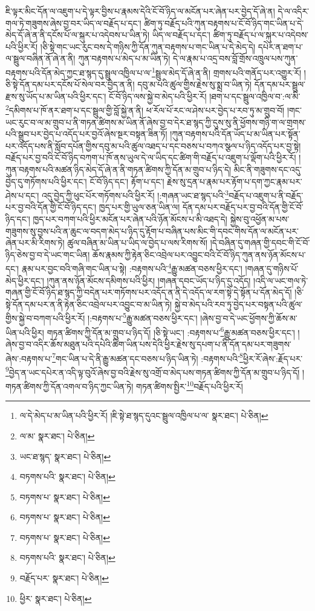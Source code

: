 ཇི་ལྟར་མིང་དོན་ལ་འཇུག་པ་དེ་ལྟར་བྱིས་པ་རྣམས་དེའི་ངོ་བོ་ཉིད་ལ་མངོན་པར་ཞེན་པར་བྱེད་དོ་ཞེ་ན། དེ་ལ་འདིར་གལ་ཏེ་གཟུགས་ཞེས་བྱ་བར་ཡིད་ལ་བརྗོད་པ་དང་། ཚིག་ཏུ་བརྗོད་པའི་ཀུན་བརྟགས་པ་ངོ་བོ་ཉིད་གང་ཡིན་པ་དེ་མེད་དོ་ཞེ་ན་ནི་དངོས་པོ་ལ་སྐུར་པ་འདེབས་པ་ཡིན་ཏེ། ཡིད་ལ་བརྗོད་པ་དང་། ཚིག་ཏུ་བརྗོད་པ་ལ་སྐུར་པ་འདེབས་པའི་ཕྱིར་རོ། །ཅི་སྟེ་གང་ཡང་རུང་བས་དེ་གཉིས་ཀྱི་དོན་ཀུན་བརྟགས་པ་གང་ཡིན་པ་དེ་མེད་དེ། དཔེར་ན་ཐག་པ་ལ་སྦྲུལ་བཞིན་ནོ་ཞེ་ན་ནི། ཀུན་བརྟགས་པ་མེད་པ་མ་ཡིན་ཏེ། དེ་ལ་རྣམ་པ་འདྲ་བས་བློ་གྲོས་འཁྲུལ་པས་ཀུན་བརྟགས་པའི་དོན་མེད་ཀྱང་ཐ་སྙད་དུ་སྦྲུལ་འཁྱིལ་པ་ལ་\footnote{ལ་དེ་མེད་པ་མ་ཡིན་པའི་ཕྱིར་རོ། །ཇི་སྟེ་ཐ་སྙད་དུའང་སྦྲུལ་འཁྱིལ་པ་ལ་  སྣར་ཐང་།  པེ་ཅིན། }སྦྲུལ་མེད་དོ་ཞེ་ན་ནི། གྲགས་པའི་གནོད་པར་འགྱུར་རོ། །ཅི་སྟེ་དོན་དམ་པར་དངོས་པོ་སེལ་བར་བྱེད་ན་ནི། དབུ་མ་པའི་ཚུལ་གྱིས་རྗེས་སུ་སྨྲ་བ་ཡིན་ཏེ། དོན་དམ་པར་སྦྲུལ་རྫས་སུ་ཡོད་པ་མ་ཡིན་པའི་ཕྱིར་དང་། ངོ་བོ་ཉིད་ལས་སྐྱེ་བ་མེད་པའི་ཕྱིར་རོ། །ཐག་པ་དང་སྦྲུལ་འཁྱིལ་བ་:ལ་མི་\footnote{ལ་མ་  སྣར་ཐང་།  པེ་ཅིན། }དམིགས་པ་ཁོ་ནར་ཐག་པ་དང་སྦྲུལ་གྱི་བློ་སྐྱེ་ན་ནི། ཕ་རོལ་པོ་རང་ལ་ཤེས་པར་བྱེད་པ་རབ་ཏུ་མ་གྲུབ་བོ། །གང་ཡང་རུང་བ་ལ་མ་གྲུབ་པ་ནི་གཏན་ཚིགས་མ་ཡིན་ནོ་ཞེས་བྱ་བ་དེར་ཐ་སྙད་ཀྱི་དུས་སུ་ནི་ཕྱོགས་གཉི་ག་ལ་གྲགས་པའི་སྒྲུབ་པར་བྱེད་པ་འདོད་པར་བྱའོ་ཞེས་སྔར་བསྟན་ཟིན་ཏོ། །ཀུན་བརྟགས་པའི་དོན་ཡོད་པ་མ་ཡིན་པར་སྟོན་པར་འདོད་པས་ནི་སློབ་དཔོན་གྱིས་དབུ་མ་པའི་ཚུལ་འཐད་པ་དང་བཅས་པ་བཀའ་སྩལ་པ་ཉིད་འདོད་པར་བྱ་སྟེ། བརྗོད་པར་བྱ་བའི་ངོ་བོ་ཉིད་བཀག་པ་ཁོ་ནས་ཡུལ་དེ་ལ་ཡིད་དང་ཚིག་གི་བརྗོད་པ་འཇུག་པ་ལྡོག་པའི་ཕྱིར་རོ། །ཀུན་བརྟགས་པའི་མཚན་ཉིད་མེད་དོ་ཞེ་ན་ནི་གཏན་ཚིགས་ཀྱི་དོན་མ་གྲུབ་པ་ཉིད་དེ། མིང་ནི་གཟུགས་དང་འདུ་བྱེད་དུ་གཏོགས་པའི་ཕྱིར་དང་། ངོ་བོ་ཉིད་དང་། རྟོག་པ་དང་། རྗེས་སུ་དྲན་པ་རྣམ་པར་རྟོག་པ་དག་ཀྱང་རྣམ་པར་ཤེས་པ་དང་། འདུ་བྱེད་ཀྱི་ཕུང་པོར་གཏོགས་པའི་ཕྱིར་རོ། །:གཞན་ཡང་ཐ་སྙད་པའི་\footnote{ཡང་ཐ་སྙད་  སྣར་ཐང་།  པེ་ཅིན། }བརྗོད་པ་འཇུག་པ་ནི་བརྗོད་པར་བྱ་བའི་དོན་གྱི་ངོ་བོ་ཉིད་དང་། ཁྱད་པར་གྱི་ཡུལ་ཅན་ཡིན་ལ། དོན་དམ་པར་བརྗོད་པར་བྱ་བའི་དོན་གྱི་ངོ་བོ་ཉིད་དང་། ཁྱད་པར་བཀག་པའི་ཕྱིར་མངོན་པར་ཞེན་པའི་ཉོན་མོངས་པ་མི་འཐད་དེ། སྐྱེས་བུ་འཕྱོན་མ་པས་གཟུགས་སུ་བྱས་པའི་ན་ཆུང་ལ་བདག་མེད་པ་ཉིད་དུ་རྟོག་པ་བཞིན་པས་མིང་གི་དབང་གིས་དོན་ལ་མངོན་པར་ཞེན་པར་མི་རིགས་ཏེ། ཚུལ་བཞིན་མ་ཡིན་པ་ཡིད་ལ་བྱེད་པ་ལས་རིགས་སོ། །དེ་བཞིན་དུ་གཞན་གྱི་དབང་གི་ངོ་བོ་ཉིད་ཅེས་བྱ་བ་དེ་ཡང་གང་ཡིན། ཆོས་རྣམས་ཀྱི་རྟེན་ཅིང་འབྲེལ་པར་འབྱུང་བའི་ངོ་བོ་ཉིད་ཀུན་ནས་ཉོན་མོངས་པ་དང་། རྣམ་པར་བྱང་བའི་གཞི་གང་ཡིན་པ་སྟེ། :བརྟགས་པའི་\footnote{བཏགས་པའི་  སྣར་ཐང་།  པེ་ཅིན། }རྒྱུ་མཚན་བཅས་ཕྱིར་དང་། །གཞན་དུ་གཉིས་པོ་མེད་ཕྱིར་དང་། །ཀུན་ནས་ཉོན་མོངས་དམིགས་པའི་ཕྱིར། །གཞན་དབང་ཡོད་པ་ཉིད་དུ་འདོད། །འདི་ལ་ཡང་གལ་ཏེ་གཞན་གྱི་ངོ་བོ་ཉིད་ཐ་སྙད་ཀྱི་བདེན་པར་གཏོགས་པར་འདོད་ན་ནི་དེ་འདོད་ལ་རག་སྟེ་དེ་སྟོན་པ་དོན་མེད་དོ། །ཅི་སྟེ་དོན་དམ་པར་ན་ནི་རྟེན་ཅིང་འབྲེལ་པར་འབྱུང་བ་མ་ཡིན་ཏེ། སྐྱེ་བ་མེད་པའི་རབ་ཏུ་བྱེད་པར་བསྟན་པའི་ཚུལ་གྱིས་སྐྱེ་བ་བཀག་པའི་ཕྱིར་རོ། །:བརྟགས་པ་\footnote{བཏགས་པ་  སྣར་ཐང་།  པེ་ཅིན། }རྒྱུ་མཚན་བཅས་ཕྱིར་དང་། །ཞེས་བྱ་བ་དེ་ཡང་ཕྱོགས་ཀྱི་ཆོས་མ་ཡིན་པའི་ཕྱིར། གཏན་ཚིགས་ཀྱི་དོན་མ་གྲུབ་པ་ཉིད་དོ། །ཅི་སྟེ་ཡང་། :བརྟགས་པ་\footnote{བཏགས་པ་  སྣར་ཐང་།  པེ་ཅིན། }རྒྱུ་མཚན་བཅས་ཕྱིར་དང་། །ཞེས་བྱ་བ་འདིར་ཆོས་མཐུན་པའི་དཔེའི་ཚིག་ཡིན་པས་དེའི་ཕྱིར་རྗེས་སུ་དཔག་པ་ནི་དོན་དམ་པར་གཟུགས་ཞེས་:བརྟགས་པ་\footnote{བཏགས་པ་  སྣར་ཐང་།  པེ་ཅིན། }གང་ཡིན་པ་དེ་ནི་རྒྱུ་མཚན་དང་བཅས་པ་ཉིད་ཡིན་ཏེ། :བརྟགས་པའི་\footnote{བཏགས་པའི་  སྣར་ཐང་།  པེ་ཅིན། }ཕྱིར་རོ་ཞེས་:རྗོད་པར་\footnote{བརྗོད་པར་  སྣར་ཐང་།  པེ་ཅིན། }བྱེད་ན་ཡང་དཔེར་ན་འདི་ལྟ་བུའོ་ཞེས་བྱ་བའི་རྗེས་སུ་འགྲོ་བ་མེད་པས་གཏན་ཚིགས་ཀྱི་དོན་མ་གྲུབ་པ་ཉིད་དོ། །གཏན་ཚིགས་ཀྱི་དོན་འགལ་བ་ཉིད་ཀྱང་ཡིན་ཏེ། གཏན་ཚིགས་སྤྱིར་\footnote{ཕྱིར་  སྣར་ཐང་།  པེ་ཅིན། }བརྗོད་པའི་ཕྱིར་རོ། 